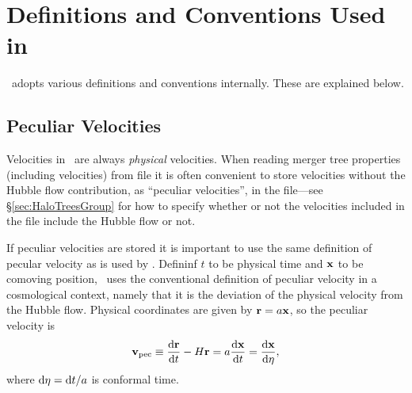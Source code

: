 \chapter{Definitions and Conventions Used in \glc}

\glc\ adopts various definitions and conventions internally. These are explained below.

\section{Peculiar Velocities}\label{sec:GalacticusVelocityDefinitions}

Velocities in \glc\ are always \emph{physical} velocities. When reading merger tree properties (including velocities) from file it is often convenient to store velocities without the Hubble flow contribution, as ``peculiar velocities'', in the file---see \S\ref{sec:HaloTreesGroup} for how to specify whether or not  the velocities included in the file include the Hubble flow or not.

If peculiar velocities are stored it is important to use the same definition of pecular velocity as is used by \glc. Defininf $t$ to be physical time and ${\bf x}$ to be comoving position, \glc\ uses the conventional definition of peculiar velocity in a cosmological context, namely that it is the deviation of the physical velocity from the Hubble flow. Physical coordinates are given by ${\bf r} = a{\bf x}$, so the peculiar velocity is
\begin{equation}
{\bf v}_{\rm pec} \equiv {{\rm d} {\bf r} \over {\rm d} t} - H {\bf r} = a {{\rm d} {\bf x}\over{\rm d} t} = {{\rm d}{\bf x}\over{\rm d}\eta},
\end{equation}
where ${\rm d}\eta = {\rm d}t/a$ is conformal time. 
